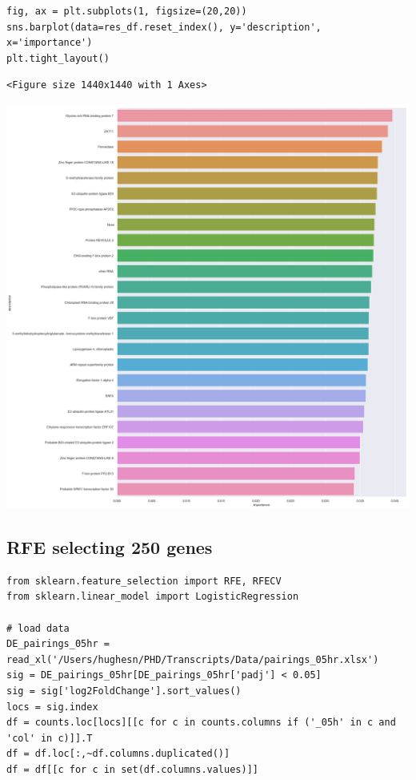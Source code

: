 \documentclass[11pt]{article}
\begin{document}
\begin{verbatim}
fig, ax = plt.subplots(1, figsize=(20,20))
sns.barplot(data=res_df.reset_index(), y='description', x='importance')
plt.tight_layout()
\end{verbatim}

\begin{verbatim}
<Figure size 1440x1440 with 1 Axes>
\end{verbatim}


\begin{center}
\includegraphics[width=.9\linewidth]{obipy-resources/93e2fbf76ed477962282ae99767b8408de4d3ed9/6c6e3438472c5becb4dd5927f01def5d25fd9d41.png}
\end{center}


\subsection{RFE selecting 250 genes}
\label{sec:orgcf1c68e}
\begin{verbatim}
from sklearn.feature_selection import RFE, RFECV
from sklearn.linear_model import LogisticRegression

# load data
DE_pairings_05hr = read_xl('/Users/hughesn/PHD/Transcripts/Data/pairings_05hr.xlsx')
sig = DE_pairings_05hr[DE_pairings_05hr['padj'] < 0.05]
sig = sig['log2FoldChange'].sort_values()
locs = sig.index
df = counts.loc[locs][[c for c in counts.columns if ('_05h' in c and 'col' in c)]].T
df = df.loc[:,~df.columns.duplicated()]
df = df[[c for c in set(df.columns.values)]]
\end{verbatim}
\end{document}
